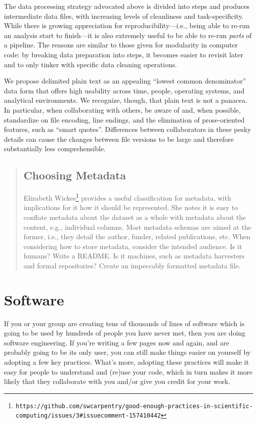 \documentclass[10pt]{article}
\newcommand{\withurl}[2]{{#1}\footnote{\texttt{#2}}}
\begin{document}
The data processing strategy advocated above is divided into steps and
produces intermediate data files, with increasing levels of cleanliness
and task-specificity. While there is growing appreciation for
reproducibility---i.e., being able to re-run an analysis start to
finish---it is also extremely useful to be able to re-run \emph{parts}
of a pipeline. The reasons are similar to those given for modularity in
computer code: by breaking data preparation into steps, it becomes
easier to revisit later and to only tinker with specific data cleaning
operations.

We propose delimited plain text as an appealing ``lowest common
denominator'' data form that offers high usability across time, people,
operating systems, and analytical environments. We recognize, though,
that plain text is not a panacea. In particular, when collaborating with
others, be aware of and, when possible, standardize on file encoding,
line endings, and the elimination of prose-oriented features, such as
``smart quotes''. Differences between collaborators in these pesky
details can cause the changes between file versions to be large and
therefore substantially less comprehensible.

\begin{quote}
\subsection*{Choosing Metadata}

\withurl{Elizabeth
  Wickes}{https://github.com/swcarpentry/good-enough-practices-in-scientific-computing/issues/3\#issuecomment-157410442}
provides a useful classification for metadata, with implications for
it how it should be represented. She notes it is easy to conflate
metadata about the dataset as a whole with metadata about the content,
e.g., individual columns. Most metadata schemas are aimed at the
former, i.e., they detail the author, funder, related publications,
etc. When considering how to store metadata, consider the intended
audience. Is it humans? Write a README. Is it machines, such as
metadata harvesters and formal repositories? Create an impeccably
formatted metadata file.
\end{quote}

\section{Software}\label{software}

If you or your group are creating tens of thousands of lines of software
which is going to be used by hundreds of people you have never met, then
you are doing software engineering. If you're writing a few pages now
and again, and are probably going to be its only user, you can still
make things easier on yourself by adopting a few key practices. What's
more, adopting these practices will make it easy for people to
understand and (re)use your code, which in turn makes it more likely
that they collaborate with you and/or give you credit for your work.
\end{document}
